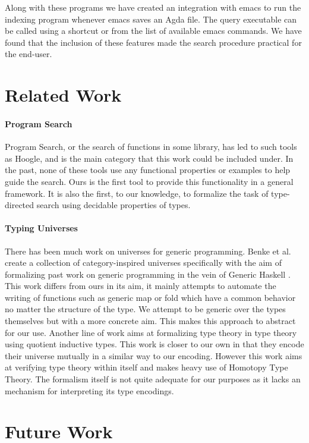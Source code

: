 \documentclass[acmsmall,review,authorversion]{acmart}
\newcommand{\?}{\stackrel{?}{\approx}}
\begin{document}
Along with these programs we have created an integration with emacs to run the
indexing program whenever emacs saves an Agda file. The query executable can be
called using a shortcut or from the list of available emacs commands. We have
found that the inclusion of these features made the search procedure practical
for the end-user.

\section{Related Work}

\paragraph{Program Search} Program Search, or the search of functions in some
library, has led to such tools as Hoogle, and is the main category that this
work could be included under. In the past, none of these tools use any
functional properties or examples to help guide the search. Ours is the first
tool to provide this functionality in a general framework. It is also the first,
to our knowledge, to formalize the task of type-directed search using decidable
properties of types.

\paragraph{Typing Universes} There has been much work on universes for generic
programming. Benke et al. create a collection of category-inspired universes
specifically with the aim of formalizing past work on generic programming in the
vein of Generic Haskell \cite{benke2003universes}. This work differs from ours
in its aim, it mainly attempts to automate the writing of functions such as
generic map or fold which have a common behavior no matter the structure of the
type. We attempt to be generic over the types themselves but with a more
concrete aim. This makes this approach to abstract for our use. Another line of
work aims at formalizing type theory in type theory using quotient inductive
types\cite{altenkirch2016type}. This work is closer to our own in that they
encode their universe mutually in a similar way to our encoding. However this
work aims at verifying type theory within itself and makes heavy use of Homotopy
Type Theory\cite{HoTT}. The formalism itself is not quite adequate for our
purposes as it lacks an mechanism for interpreting its type encodings.

\section{Future Work}
\end{document}
